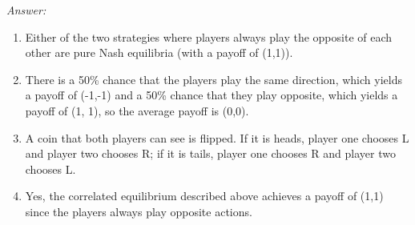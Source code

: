 \documentclass{article}
\theoremstyle{definition}
\newenvironment{answer}{\noindent\textit{Answer:}}{}
\begin{document}
\begin{answer}
    \begin{enumerate}
        \item Either of the two strategies where players always play the opposite of each other are pure Nash equilibria (with a payoff of (1,1)).
        \item There is a 50\% chance that the players play the same direction, which yields a payoff of (-1,-1) and a 50\% chance that they play opposite, which yields a payoff of (1, 1), so the average payoff is (0,0).
        \item A coin that both players can see is flipped. If it is heads, player one chooses L and player two chooses R; if it is tails, player one chooses R and player two chooses L.
        \item Yes, the correlated equilibrium described above achieves a payoff of (1,1) since the players always play opposite actions.
    \end{enumerate} 
\end{answer}
\end{document}
